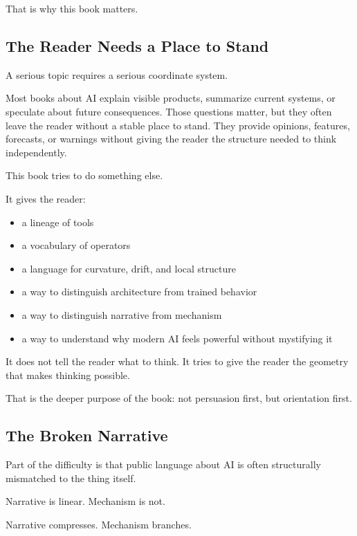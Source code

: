 That is why this book matters.

\hypertarget{the-reader-needs-a-place-to-stand}{%
\subsection{The Reader Needs a Place to
Stand}\label{the-reader-needs-a-place-to-stand}}

A serious topic requires a serious coordinate system.

Most books about AI explain visible products, summarize current systems,
or speculate about future consequences. Those questions matter, but they
often leave the reader without a stable place to stand. They provide
opinions, features, forecasts, or warnings without giving the reader the
structure needed to think independently.

This book tries to do something else.

It gives the reader:

\begin{itemize}
\tightlist
\item
  a lineage of tools
\item
  a vocabulary of operators
\item
  a language for curvature, drift, and local structure
\item
  a way to distinguish architecture from trained behavior
\item
  a way to distinguish narrative from mechanism
\item
  a way to understand why modern AI feels powerful without mystifying it
\end{itemize}

It does not tell the reader what to think. It tries to give the reader
the geometry that makes thinking possible.

That is the deeper purpose of the book: not persuasion first, but
orientation first.

\hypertarget{the-broken-narrative}{%
\subsection{The Broken Narrative}\label{the-broken-narrative}}

Part of the difficulty is that public language about AI is often
structurally mismatched to the thing itself.

Narrative is linear. Mechanism is not.

Narrative compresses. Mechanism branches.


